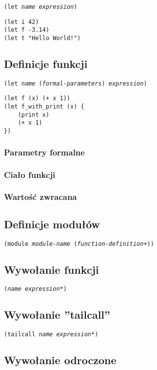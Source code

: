 \documentclass[11pt,oneside,a4paper,titlepage,onecolumn]{article}
\begin{document}
\texttt{(let \emph{name} \emph{expression})}

\begin{lstlisting}
(let i 42)
(let f -3.14)
(let t "Hello World!")
\end{lstlisting}

\subsection{Definicje funkcji}

\texttt{(let \emph{name} (\emph{formal-parameters}) \emph{expression})}

\begin{lstlisting}
(let f (x) (+ x 1))
(let f_with_print (x) {
    (print x)
    (+ x 1)
})
\end{lstlisting}

\subsubsection{Parametry formalne}
\subsubsection{Ciało funkcji}
\subsubsection{Wartość zwracana}

\subsection{Definicje modułów}

\texttt{(module \emph{module-name} (\emph{function-definition}+))}

\subsection{Wywołanie funkcji}

\texttt{(\emph{name} \emph{expression}*)}

\subsection{Wywołanie ''tailcall''}

\texttt{(tailcall \emph{name} \emph{expression}*)}

\subsection{Wywołanie odroczone}
\end{document}
